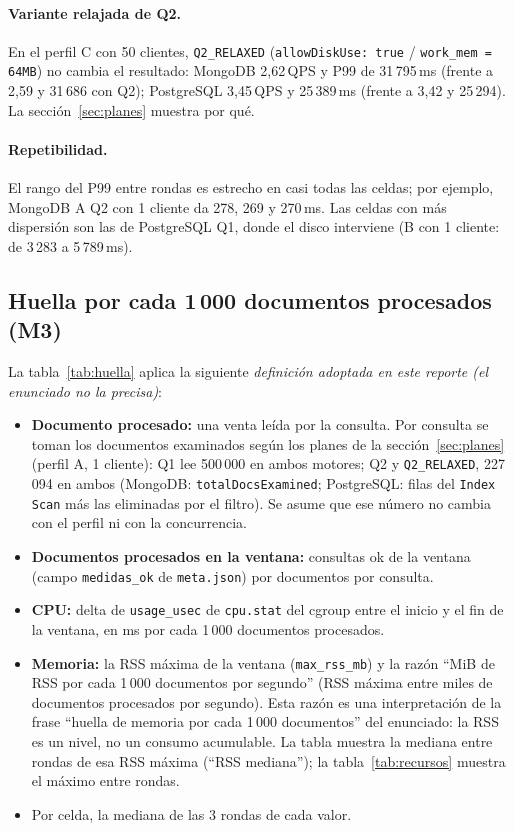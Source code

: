 \documentclass[11pt,a4paper]{article}
\newcommand{\cod}[1]{\texttt{#1}}
\begin{document}
\paragraph{Variante relajada de Q2.} En el perfil C con 50 clientes, \cod{Q2\_RELAXED}
(\cod{allowDiskUse: true} / \cod{work\_mem = 64MB}) no cambia el resultado: MongoDB
2,62\,QPS y P99 de 31\,795\,ms (frente a 2,59 y 31\,686 con Q2); PostgreSQL 3,45\,QPS y
25\,389\,ms (frente a 3,42 y 25\,294). La sección~\ref{sec:planes} muestra por qué.

\paragraph{Repetibilidad.} El rango del P99 entre rondas es estrecho en casi todas las
celdas; por ejemplo, MongoDB A Q2 con 1 cliente da 278, 269 y 270\,ms. Las celdas con más
dispersión son las de PostgreSQL Q1, donde el disco interviene (B con 1 cliente: de 3\,283
a 5\,789\,ms).

\subsection*{Huella por cada 1\,000 documentos procesados (M3)}
La tabla~\ref{tab:huella} aplica la siguiente \emph{definición adoptada en este reporte
(el enunciado no la precisa)}:
\begin{itemize}
\item \textbf{Documento procesado:} una venta leída por la consulta. Por consulta se toman
  los documentos examinados según los planes de la sección~\ref{sec:planes} (perfil A, 1
  cliente): Q1 lee 500\,000 en ambos motores; Q2 y \cod{Q2\_RELAXED}, 227\,094 en ambos
  (MongoDB: \cod{totalDocsExamined}; PostgreSQL: filas del \cod{Index Scan} más las
  eliminadas por el filtro). Se asume que ese número no cambia con el perfil ni con la
  concurrencia.
\item \textbf{Documentos procesados en la ventana:} consultas ok de la ventana (campo
  \cod{medidas\_ok} de \cod{meta.json}) por documentos por consulta.
\item \textbf{CPU:} delta de \cod{usage\_usec} de \cod{cpu.stat} del cgroup entre el inicio
  y el fin de la ventana, en ms por cada 1\,000 documentos procesados.
\item \textbf{Memoria:} la RSS máxima de la ventana (\cod{max\_rss\_mb}) y la razón ``MiB
  de RSS por cada 1\,000 documentos por segundo'' (RSS máxima entre miles de documentos
  procesados por segundo). Esta razón es una interpretación de la frase ``huella de memoria
  por cada 1\,000 documentos'' del enunciado: la RSS es un nivel, no un consumo
  acumulable. La tabla muestra la mediana entre rondas de esa RSS máxima (``RSS
  mediana''); la tabla~\ref{tab:recursos} muestra el máximo entre rondas.
\item Por celda, la mediana de las 3 rondas de cada valor.
\end{itemize}
\end{document}
